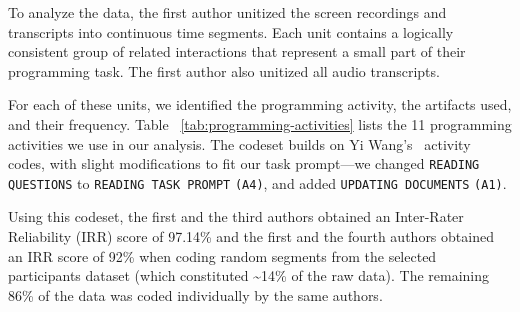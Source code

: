 

To analyze the data, the first author unitized the screen recordings and transcripts into continuous time segments. Each unit contains a logically consistent group of related interactions that represent a small part of their programming task. The first author also unitized all audio transcripts.

For each of these units, we identified the programming activity, the artifacts used, and their frequency. Table ~\ref{tab:programming-activities} lists  the 11 programming activities we use in our analysis. The codeset builds on Yi Wang's~\cite{Wang:2017} activity codes, with slight modifications to fit our task prompt---we changed \texttt{READING QUESTIONS} to \texttt{READING TASK PROMPT} \texttt{(A4)}, and added \texttt{UPDATING DOCUMENTS} \texttt{(A1)}.

Using this codeset, the first and the third authors obtained an Inter-Rater Reliability (IRR) score of 97.14\% and the first and the fourth authors obtained an IRR score of 92\% when coding random segments from the selected participants dataset (which constituted \textasciitilde14\% of the raw data). The remaining 86\% of the data was coded individually by the same authors.




